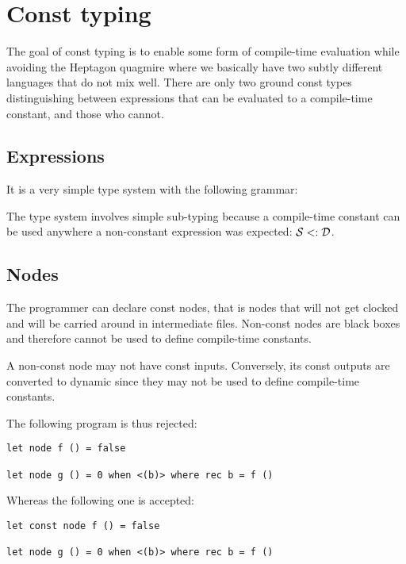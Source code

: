 \section{Const typing}

The goal of const typing is to enable some form of compile-time evaluation while
avoiding the Heptagon quagmire where we basically have two subtly different
languages that do not mix well. There are only two ground const types
distinguishing between expressions that can be evaluated to a compile-time
constant, and those who cannot.

\subsection{Expressions}

It is a very simple type system with the following grammar:

The type system involves simple sub-typing because a compile-time constant can
be used anywhere a non-constant expression was expected: $\mathcal{S} \mathrel{<:} \mathcal{D}$.

\subsection{Nodes}

The programmer can declare const nodes, that is nodes that will not get clocked
and will be carried around in intermediate files. Non-const nodes are black
boxes and therefore cannot be used to define compile-time constants.

A non-const node may not have const inputs. Conversely, its const outputs are
converted to dynamic since they may not be used to define compile-time constants.

The following program is thus rejected:
\begin{verbatim}
let node f () = false

let node g () = 0 when <(b)> where rec b = f ()
\end{verbatim}
Whereas the following one is accepted:
\begin{verbatim}
let const node f () = false

let node g () = 0 when <(b)> where rec b = f ()
\end{verbatim}

